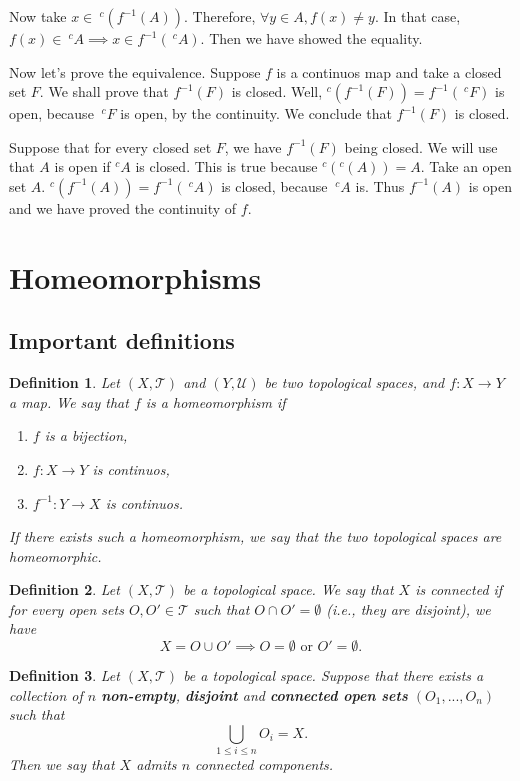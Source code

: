 \documentclass[a4paper,11pt]{article}
\theoremstyle{mytheor}
\newtheorem{definition}{Definition}[subsection]
\theoremstyle{mytheor}
\theoremstyle{remark}
\newcommand{\T}{\mathcal{T}}
\newcommand{\U}{\mathcal{U}}
\begin{document}
Now take $x \in ~^c(f^{-1}(A))$. Therefore, $\forall y \in A, f(x) \neq y$. In
that case, $f(x) \in ~^cA \implies x \in f^{-1}(~^cA)$. Then we have showed
the equality. 

\vspace{5mm}

Now let's prove the equivalence. Suppose $f$ is a continuos map and take a
closed set $F$. We shall prove that $f^{-1}(F)$ is closed. Well, $^c(f^{-1}(F))
= f^{-1}(~^cF)$ is open, because $~^cF$ is open, by the continuity. We
conclude that $f^{-1}(F)$ is closed. 

Suppose that for every closed set $F$, we have $f^{-1}(F)$ being closed. We
will use that $A$ is open if $^cA$ is closed. This is true because $^c(^c(A))
= A$. Take an open set $A$. $^c(f^{-1}(A)) = f^{-1}(~^cA)$
is closed, because $~^cA$ is. Thus $f^{-1}(A)$ is open and we have proved the
continuity of $f$. 


\section{Homeomorphisms}

\subsection{Important definitions}

\begin{definition}
    Let $(X, \T)$ and $(Y, \U)$ be two topological spaces, and $f : X
    \to Y$ a map. We say that $f$ is a homeomorphism if
    \begin{enumerate}
        \item $f$ is a bijection, 
        \item $f : X \to Y$ is continuos, 
        \item $f^{-1} : Y \to X$ is continuos.
    \end{enumerate}
    If there exists such a homeomorphism, we say that the two topological
    spaces are homeomorphic.
\end{definition}

\begin{definition}
    Let $(X, \T)$ be a topological space. We say that $X$ is connected if for
    every open sets $O, O' \in \T$ such that $O \cap O' = \emptyset$ (i.e.,
    they are disjoint), we have
    $$X = O \cup O' \implies O = \emptyset \text{ or } O' = \emptyset.$$
\end{definition}

\begin{definition}
    Let $(X, \T)$ be a topological space. Suppose that there exists a
    collection of $n$ \textbf{non-empty}, \textbf{disjoint} and
    \textbf{connected open sets} $(O_1, ..., O_n)$ such that
    $$
    \bigcup_{1 \le i \le n} O_i = X.
    $$
    Then we say that $X$ admits $n$ connected components.
\end{definition}
\end{document}
